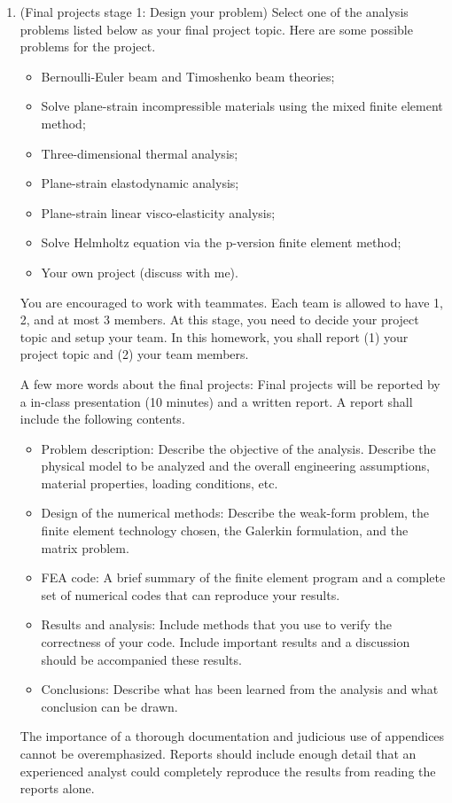 \documentclass[12pt]{article}
\begin{document}
\begin{enumerate}
\item(Final projects stage 1: Design your problem) Select one of the analysis problems listed below as your final project topic. Here are some possible problems for the project.
\begin{itemize}
\item Bernoulli-Euler beam and Timoshenko beam theories;
\item Solve plane-strain incompressible materials using the mixed finite element method;
\item Three-dimensional thermal analysis;
\item Plane-strain elastodynamic analysis;
\item Plane-strain linear visco-elasticity analysis;
\item Solve Helmholtz equation via the p-version finite element method;
\item Your own project (discuss with me).
\end{itemize}
You are encouraged to work with teammates. Each team is allowed to have 1, 2, and at most 3 members. At this stage, you need to decide your project topic and setup your team. In this homework, you shall report (1) your project topic and (2) your team members.

A few more words about the final projects: Final projects will be reported by a in-class presentation (10 minutes) and a written report. A report shall include the following contents.
\begin{itemize}
\item Problem description: Describe the objective of the analysis. Describe the physical model to be analyzed and the overall engineering assumptions, material properties, loading conditions, etc.
\item Design of the numerical methods: Describe the weak-form problem, the finite element technology chosen, the Galerkin formulation, and the matrix problem.
\item FEA code: A brief summary of the finite element program and a complete set of numerical codes that can reproduce your results.
\item Results and analysis: Include methods that you use to verify the correctness of your code. Include important results and a discussion should be accompanied these results.
\item Conclusions: Describe what has been learned from the analysis and what conclusion can be drawn.
\end{itemize}
The importance of a thorough documentation and judicious use of appendices cannot be overemphasized. Reports should include enough detail that an experienced analyst could completely reproduce the results from reading the reports alone.
\end{enumerate}
\end{document}
